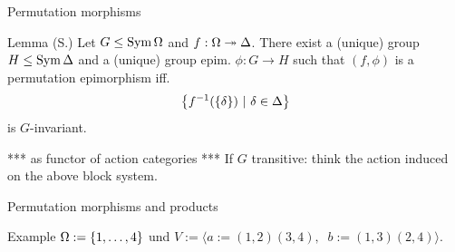 \documentclass{beamer}
\theoremstyle{plain}
\theoremstyle{definition}
\newcommand{\todo}[1]{{\color{red}*** #1 ***}}
\begin{document}
\begin{frame}{Permutation morphisms}
\begin{block}{Lemma (S.)}
Let $G \leq \operatorname{Sym} \Omega$ and $f : \Omega \twoheadrightarrow \Delta$.
There exist a (unique) group $H \leq \operatorname{Sym} \Delta$ and a (unique)
group epim. $\phi : G \to H$ such that
$(f, \phi)$ is a permutation epimorphism
iff.
\[
     \left\{  f ^ {-1}( \left\{ \delta \right\} ) ~|~ \delta \in \Delta  \right\} 
\]
is $G$-invariant.
\end{block}

\pause
\todo{as functor of action categories}
\pause
If $G$ transitive: think the action induced on the above block system.
\end{frame}

%

\begin{frame}{Permutation morphisms and products}
\begin{block}{Example}
$\Omega :=  \left\{ 1, \ldots, 4 \right\} $ und
$V := \langle a := (1,2)(3,4),~$%
$b := (1,3)(2,4) \rangle$.

\begin{figure}[H]
\centering
{}
\end{figure}

\end{block}
\end{frame}
\end{document}
